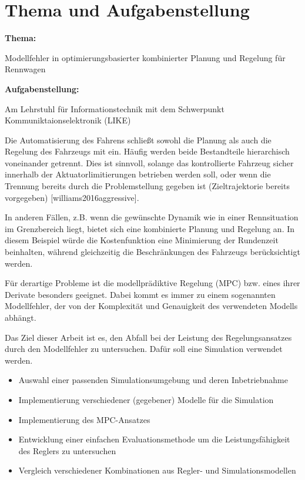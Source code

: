  

\chapter*{Thema und Aufgabenstellung}
\textbf{Thema:}\par\smallskip

 Modellfehler in optimierungsbasierter kombinierter Planung und Regelung für Rennwagen

\par\bigskip
\textbf{Aufgabenstellung:}\par\smallskip
Am Lehrstuhl für Informationstechnik mit dem Schwerpunkt Kommuniktaionselektronik (LIKE)
\par\smallskip  
Die Automatisierung des Fahrens schließt sowohl die Planung als auch die Regelung des Fahrzeugs mit ein. Häufig werden beide Bestandteile hierarchisch voneinander getrennt. Dies ist sinnvoll, solange das kontrollierte Fahrzeug sicher innerhalb der Aktuatorlimitierungen betrieben werden soll, oder wenn die Trennung bereits durch die Problemstellung gegeben ist (Zieltrajektorie bereits vorgegeben) [williams2016aggressive].  

In anderen Fällen, z.B. wenn die gewünschte Dynamik wie in einer Rennsituation im Grenzbereich liegt, bietet sich eine kombinierte Planung und Regelung an. In diesem Beispiel würde die Kostenfunktion eine Minimierung der Rundenzeit beinhalten, während gleichzeitig die Beschränkungen des Fahrzeugs berücksichtigt werden.

Für derartige Probleme ist die modellprädiktive Regelung (MPC) bzw. eines ihrer Derivate besonders geeignet. Dabei kommt es immer zu einem sogenannten Modellfehler, der von der Komplexität und Genauigkeit des verwendeten Modells abhängt.

Das Ziel dieser Arbeit ist es, den Abfall bei der Leistung des Regelungsansatzes durch den Modellfehler zu untersuchen. Dafür soll eine Simulation verwendet werden.

\begin{itemize}
\item Auswahl einer passenden Simulationsumgebung und deren Inbetriebnahme
\item Implementierung verschiedener (gegebener) Modelle für die Simulation
\item Implementierung des MPC-Ansatzes
\item Entwicklung einer einfachen Evaluationsmethode um die Leistungsfähigkeit des Reglers zu untersuchen
\item Vergleich verschiedener Kombinationen aus Regler- und Simulationsmodellen
\end{itemize}